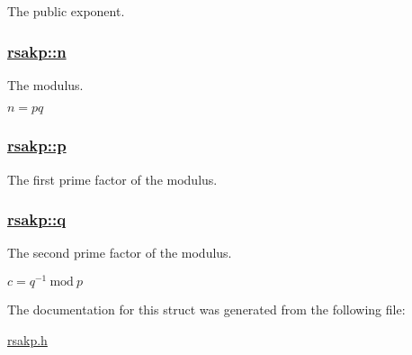The public exponent. 

\hypertarget{structrsakp_o0}{
\subsubsection[n]{\setlength{\rightskip}{0pt plus 5cm}\hyperlink{structrsakp_o0}{rsakp::n}}}
\label{structrsakp_o0}


The modulus. 

$n=pq$ \hypertarget{structrsakp_o3}{
\subsubsection[p]{\setlength{\rightskip}{0pt plus 5cm}\hyperlink{structrsakp_o3}{rsakp::p}}}
\label{structrsakp_o3}


The first prime factor of the modulus. 

\hypertarget{structrsakp_o4}{
\subsubsection[q]{\setlength{\rightskip}{0pt plus 5cm}\hyperlink{structrsakp_o4}{rsakp::q}}}
\label{structrsakp_o4}


The second prime factor of the modulus. 

$c=q^{-1}\ \textrm{mod}\ p$ 

The documentation for this struct was generated from the following file:\begin{CompactItemize}
\item 
\hyperlink{rsakp_8h}{rsakp.h}\end{CompactItemize}
